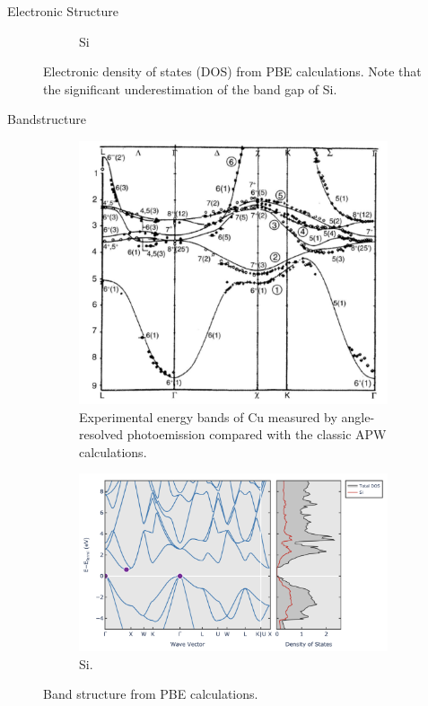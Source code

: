 \documentclass[aspectratio=169]{beamer}
\begin{document}
\begin{frame}{Electronic Structure}
\begin{figure}
\begin{subfigure}{0.3\textwidth}
                \caption{Si}
            \end{subfigure}
            \caption{Electronic density of states (DOS) from PBE calculations.\cite{shollDensityFunctionalTheory2009} Note that the significant underestimation of the band gap of Si.}
            \label{fig}
        \end{figure}
    \end{frame}

    \begin{frame}{Bandstructure}
        \begin{figure}
            \centering
            \begin{subfigure}{0.45\textwidth}
                \centering
                \includegraphics[width=0.8\linewidth]{lectures/figures/8_Bandstructure_Cu.png}
                \caption{Experimental energy bands of Cu measured by angle-resolved photoemission compared with the classic APW calculations.\cite{martinElectronicStructureBasic2004}}
            \end{subfigure}
            \begin{subfigure}{0.5\textwidth}
                \centering
                \includegraphics[width=\linewidth]{lectures/figures/8_Bandstructure_Si.png}
                \caption{Si.\cite{jainCommentaryMaterialsProject2013}}
            \end{subfigure}
            \caption{Band structure from PBE calculations.}
            \label{fig}
        \end{figure}
    \end{frame}
\end{document}
